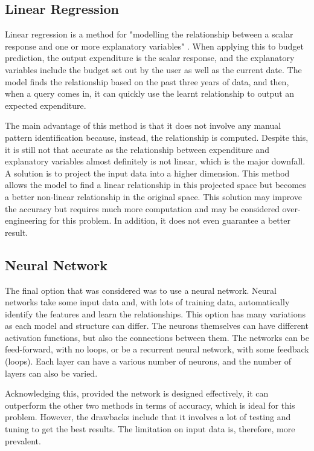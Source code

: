 \subsection{Linear Regression}
Linear regression is a method for "modelling the relationship between a scalar response and one or more explanatory variables" \cite{LinearRegressionWiki}. When applying this to budget prediction, the output expenditure is the scalar response, and the explanatory variables include the budget set out by the user as well as the current date. The model finds the relationship based on the past three years of data, and then, when a query comes in, it can quickly use the learnt relationship to output an expected expenditure.

The main advantage of this method is that it does not involve any manual pattern identification because, instead, the relationship is computed. Despite this, it is still not that accurate as the relationship between expenditure and explanatory variables almost definitely is not linear, which is the major downfall. A solution is to project the input data into a higher dimension. This method allows the model to find a linear relationship in this projected space but becomes a better non-linear relationship in the original space. This solution may improve the accuracy but requires much more computation and may be considered over-engineering for this problem. In addition, it does not even guarantee a better result.

\subsection{Neural Network}
The final option that was considered was to use a neural network. Neural networks take some input data and, with lots of training data, automatically identify the features and learn the relationships. This option has many variations as each model and structure can differ. The neurons themselves can have different activation functions, but also the connections between them. The networks can be feed-forward, with no loops, or be a recurrent neural network, with some feedback (loops). Each layer can have a various number of neurons, and the number of layers can also be varied.

Acknowledging this, provided the network is designed effectively, it can outperform the other two methods in terms of accuracy, which is ideal for this problem. However, the drawbacks include that it involves a lot of testing and tuning to get the best results. The limitation on input data is, therefore, more prevalent.

